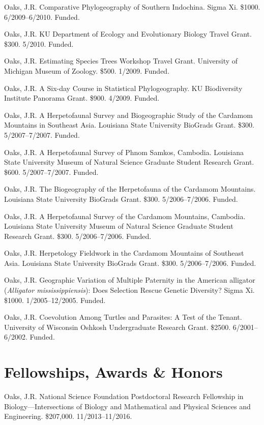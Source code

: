 \myHangIndent
Oaks, J.R.
Comparative Phylogeography of Southern Indochina.
Sigma Xi.
\$1000.
6/2009--6/2010.
Funded.

\myHangIndent
Oaks, J.R.
KU Department of Ecology and Evolutionary Biology Travel Grant.
\$300.
5/2010.
Funded.

\myHangIndent
Oaks, J.R.
Estimating Species Trees Workshop Travel Grant.
University of Michigan Museum of Zoology.
\$500.
1/2009.
Funded.

\myHangIndent
Oaks, J.R.
A Six-day Course in Statistical Phylogeography.
KU Biodiversity Institute Panorama Grant.
\$900.
4/2009.
Funded.

\myHangIndent
Oaks, J.R.
A Herpetofaunal Survey and Biogeographic Study of the Cardamom Mountains in
Southeast Asia.
Louisiana State University BioGrads Grant.
\$300.
5/2007--7/2007.
Funded.

\myHangIndent
Oaks, J.R.
A Herpetofaunal Survey of Phnom Samkos, Cambodia.
Louisiana State University Museum of Natural Science Graduate Student Research
Grant.
\$600.
5/2007--7/2007.
Funded.

\myHangIndent
Oaks, J.R.
The Biogeography of the Herpetofauna of the Cardamom Mountains.
Louisiana State University BioGrads Grant.
\$300.
5/2006--7/2006.
Funded.

\myHangIndent
Oaks, J.R.
A Herpetofaunal Survey of the Cardamom Mountains, Cambodia.
Louisiana State University Museum of Natural Science Graduate Student Research
Grant.
\$300.
5/2006--7/2006.
Funded.

\myHangIndent
Oaks, J.R.
Herpetology Fieldwork in the Cardamom Mountains of Southeast Asia.
Louisiana State University BioGrads Grant.
\$300.
5/2006--7/2006.
Funded.

\myHangIndent
Oaks, J.R.
Geographic Variation of Multiple Paternity in the American alligator
(\emph{Alligator mississippiensis}): Does Selection Rescue Genetic Diversity?
Sigma Xi.
\$1000.
1/2005--12/2005.
Funded.

\myHangIndent
Oaks, J.R.
Coevolution Among Turtles and Parasites: A Test of the Tenant.
University of Wisconsin Oshkosh Undergraduate Research Grant.
\$2500.
6/2001--6/2002.
Funded.

\section*{Fellowships, Awards \& Honors}
\myHangIndent
Oaks, J.R.
National Science Foundation Postdoctoral Research Fellowship in
Biology---Intersections of Biology and Mathematical and Physical Sciences and
Engineering.
\$207,000.
11/2013--11/2016.

